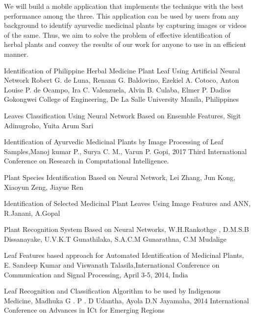 We will build a mobile application that implements the technique with the best performance among the three. This application can be used by users from any background to identify ayurvedic medicinal plants by capturing images or videos of the same. Thus, we aim to solve the problem of effective identification of herbal plants and convey the results of our work for anyone to use in an efficient manner.


\clearpage
{}
\begin{thebibliography}{99}

Identification of Philippine Herbal Medicine Plant Leaf Using Artificial Neural Network Robert G. de Luna, Renann G. Baldovino, Ezekiel A. Cotoco, Anton Louise P. de Ocampo, Ira C. Valenzuela, Alvin B. Culaba, Elmer P. Dadios Gokongwei College of Engineering, De La Salle University Manila, Philippines

Leaves Classification Using Neural Network Based on Ensemble Features, Sigit Adinugroho, Yuita Arum Sari

Identification of Ayurvedic Medicinal Plants by Image Processing of Leaf Samples,Manoj kumar P., Surya C. M., Varun P. Gopi, 2017 Third International Conference on Research in Computational Intelligence.

Plant Species Identification Based on Neural Network, Lei Zhang, Jun Kong, Xiaoyun Zeng, Jiayue Ren

Identification of Selected Medicinal Plant Leaves Using Image Features and ANN, R.Janani, A.Gopal

Plant Recognition System Based on Neural Networks, W.H.Rankothge , D.M.S.B Dissanayake, U.V.K.T Gunathilaka, S.A.C.M Gunarathna, C.M Mudalige

Leaf Features based approach for Automated Identification of Medicinal Plants, E. Sandeep Kumar and Viswanath Talasila,International Conference on Communication and Signal Processing, April 3-5, 2014, India

Leaf Recognition and Classification Algorithm to be used by Indigenous Medicine, Madhuka G . P . D Udantha, Ayola D.N Jayamaha, 2014 International Conference on Advances in ICt for Emerging Regions


\end{thebibliography}
